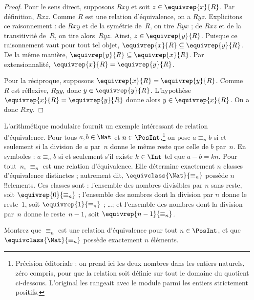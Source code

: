 \documentclass[11pt,a4paper,openany]{memoir}
\begin{document}
\begin{proof}
Pour le sens direct, supposons $Rxy$ et soit $z \in \equivrep{x}{R}$.
Par définition, $Rxz$. Comme $R$ est une relation d’équivalence, on a $Ryz$.
Explicitons ce raisonnement : de $Rxy$ et de la symétrie de~$R$, on tire
$Ryx$ ; de $Rxz$ et de la transitivité de~$R$, on tire alors~$Ryz$.
Ainsi, $z \in \equivrep{y}{R}$. Puisque ce raisonnement vaut pour tout
tel objet, $\equivrep{x}{R} \subseteq \equivrep{y}{R}$. De la même manière,
$\equivrep{y}{R} \subseteq \equivrep{x}{R}$. Par extensionnalité,
$\equivrep{x}{R} = \equivrep{y}{R}$.

Pour la réciproque, supposons $\equivrep{x}{R} = \equivrep{y}{R}$.
Comme $R$ est réflexive, $Ryy$, donc $y \in \equivrep{y}{R}$.
L’hypothèse $\equivrep{x}{R} = \equivrep{y}{R}$ donne alors
$y \in \equivrep{x}{R}$. On a donc $Rxy$.
\end{proof}

\begin{ex}
L’arithmétique modulaire fournit un exemple intéressant de relation
d’équivalence. Pour tous $a,b \in \Nat$ et $n \in \PosInt$,\footnote{Précision
éditoriale : on prend ici les deux nombres dans les entiers naturels,
zéro compris, pour que la relation soit définie sur tout le domaine du
quotient ci-dessous. L’original les rangeait avec le module parmi les
entiers strictement positifs.}
on pose $a \equiv_n b$ si et seulement si la division de $a$ par~$n$
donne le même reste que celle de $b$ par~$n$. En symboles : $a \equiv_n b$
si et seulement s’il existe $k \in \Int$ tel que $a - b = kn$.
Pour tout~$n$, $\equiv_n$ est une relation d’équivalence. Elle détermine
exactement $n$ classes d’équivalence distinctes ; autrement dit,
$\equivclass{\Nat}{\equiv_n}$ possède $n$ !!{element}s. Ces classes sont :
l’ensemble des nombres divisibles par $n$ sans reste, soit
$\equivrep{0}{\equiv_n}$ ; l’ensemble des nombres dont la division par $n$
donne le reste~$1$, soit $\equivrep{1}{\equiv_n}$ ; \ldots ; et l’ensemble
des nombres dont la division par~$n$ donne le reste~$n-1$, soit
$\equivrep{n-1}{\equiv_n}$.
\end{ex}

\begin{prob}
Montrez que $\equiv_n$ est une relation d’équivalence pour tout
$n \in \PosInt$, et que $\equivclass{\Nat}{\equiv_n}$ possède exactement
$n$ éléments.
\end{prob}


\endgroup
\end{document}
